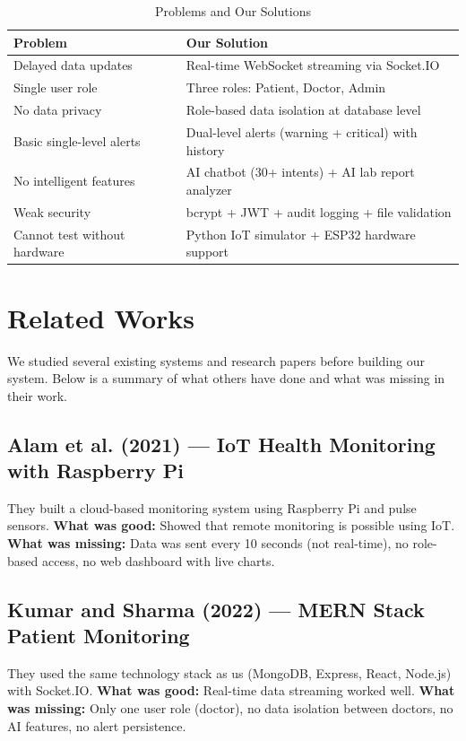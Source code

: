 \documentclass[12pt,a4paper]{article}
\begin{document}
\begin{table}[H]
\centering
\caption{Problems and Our Solutions}
\begin{tabular}{|p{5cm}|p{7cm}|}
\hline
\textbf{Problem} & \textbf{Our Solution} \\
\hline
Delayed data updates & Real-time WebSocket streaming via Socket.IO \\
\hline
Single user role & Three roles: Patient, Doctor, Admin \\
\hline
No data privacy & Role-based data isolation at database level \\
\hline
Basic single-level alerts & Dual-level alerts (warning + critical) with history \\
\hline
No intelligent features & AI chatbot (30+ intents) + AI lab report analyzer \\
\hline
Weak security & bcrypt + JWT + audit logging + file validation \\
\hline
Cannot test without hardware & Python IoT simulator + ESP32 hardware support \\
\hline
\end{tabular}
\end{table}

\section{Related Works}

We studied several existing systems and research papers before building our system. Below is a summary of what others have done and what was missing in their work.

\subsection{Alam et al. (2021) --- IoT Health Monitoring with Raspberry Pi}
They built a cloud-based monitoring system using Raspberry Pi and pulse sensors. \textbf{What was good:} Showed that remote monitoring is possible using IoT. \textbf{What was missing:} Data was sent every 10 seconds (not real-time), no role-based access, no web dashboard with live charts.

\subsection{Kumar and Sharma (2022) --- MERN Stack Patient Monitoring}
They used the same technology stack as us (MongoDB, Express, React, Node.js) with Socket.IO. \textbf{What was good:} Real-time data streaming worked well. \textbf{What was missing:} Only one user role (doctor), no data isolation between doctors, no AI features, no alert persistence.
\end{document}

